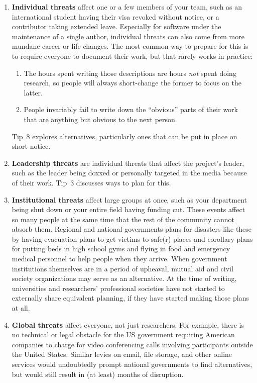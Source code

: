 \documentclass[10pt,letterpaper]{article}
\begin{document}
\begin{enumerate}
\item
  \textbf{Individual threats} affect one or a few members of your team,
  such as an international student having their visa revoked without notice, or a contributor taking extended leave.
  Especially for software under the maintenance of a single author,
  individual threats can also come from more mundane career or life changes.
  The most common way to prepare for this is to require everyone to document their work,
  but that rarely works in practice:
  \begin{enumerate}
  \item
    The hours spent writing those descriptions are hours \emph{not} spent doing research,
    so people will always short-change the former to focus on the latter.
  \item
    People invariably fail to write down the ``obvious'' parts of their work
    that are anything but obvious to the next person.
  \end{enumerate}
  Tip~8 explores alternatives,
  particularly ones that can be put in place on short notice.

\item
  \textbf{Leadership threats} are individual threats that affect the project's leader,
  such as the leader being doxxed or personally targeted in the media because of their work.
  Tip~3 discusses ways to plan for this.

\item
  \textbf{Institutional threats} affect large groups at once,
  such as your department being shut down
  or your entire field having funding cut.
  These events affect so many people at the same time
  that the rest of the community cannot absorb them.
  Regional and national governments plans for disasters like these
  by having evacuation plans to get victims to safe(r) places
  and corollary plans for putting beds in high school gyms
  and flying in food and emergency medical personnel to help people when they arrive.
  When government institutions themselves are in a period of upheaval, 
  mutual aid and civil society organizations may serve as an alternative.
  At the time of writing,
  universities and researchers' professional societies have not started to externally share equivalent planning, if they have started making those plans at all.

\item
  \textbf{Global threats} affect everyone,
  not just researchers.
  For example,
  there is no technical or legal obstacle for the US government
  requiring American companies to charge for video conferencing calls
  involving participants outside the United States.
  Similar levies on email,
  file storage,
  and other online services would undoubtedly prompt national governments to find alternatives,
  but would still result in (at least) months of disruption.

\end{enumerate}
\end{document}

